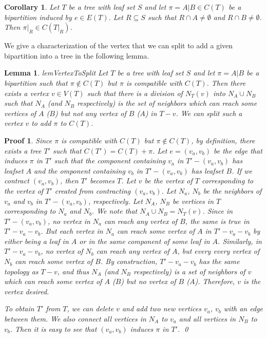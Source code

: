 \documentclass{bmcart}
\theoremstyle{mystyle}
\newtheorem{lemma}{Lemma}
\newtheorem{corollary}{Corollary}
\theoremstyle{proofstyle}
\newtheorem*{proof2}{Proof}
\newenvironment{proofnospace}{\begin{proof2}}{\qed \end{proof2}}
\begin{document}
\begin{corollary} \label{cor:bipar_restrict}
    Let $T$ be a tree with leaf set $S$ and let $\pi = A|B \in C(T)$ be a bipartition induced by $e \in E(T)$. Let $R \subseteq S$ such that $R \cap A \neq \emptyset$ and $R \cap B \neq \emptyset$. Then $\pi|_R \in C(T|_R)$. 
\end{corollary}

We give a characterization of the vertex that we can split to add a given bipartition into a tree in the following lemma.
\begin{lemma}{lemVertexToSplit} \label{lem:vertex_to_split}
    Let $T$ be a tree with leaf set $S$ and let $\pi = A|B$ be a bipartition such that $\pi \notin C(T)$ but $\pi$ is compatible with $C(T)$. Then there exists a vertex $v \in V(T)$ such that there is a division of $N_T(v)$ into $N_A \cup N_B$ such that $N_A$ (and $N_B$ respectively) is the set of neighbors which can reach some vertices of $A$ ($B$) but not any vertex of $B$ ($A$) in $T-v$. We can split such a vertex $v$ to add $\pi$ to $C(T)$.
\end{lemma}
\begin{proofnospace}
Since $\pi$ is compatible with $C(T)$ but $\pi \notin C(T)$, by definition, there exists a tree $T'$ such that $C(T') = C(T) + \pi$. Let $e = (v_a,v_b)$ be the edge that induces $\pi$ in $T'$ such that the component containing $v_a$ in $T'-(v_a,v_b)$ has leafset $A$ and the omponent containing $v_b$ in $T'-(v_a,v_b)$ has leafset $B$. If we contract $(v_a,v_b)$, then $T'$ becomes $T$. Let $v$ be the vertex of $T$ corresponding to the vertex of $T'$ created from contracting $(v_a,v_b)$. Let $N_a$, $N_b$ be the neighbors of $v_a$ and $v_b$ in $T'-(v_a,v_b)$, respectively. Let $N_A$, $N_B$ be vertices in $T$ corresponding to $N_a$ and $N_b$. We note that $N_A \cup N_B = N_T(v)$. Since in $T' -(v_a,v_b)$, no vertex in $N_a$ can reach any vertex of $B$, the same is true in $T' - v_a - v_b$. But each vertex in $N_a$ can reach some vertex of $A$ in $T' - v_a - v_b$ by either being a leaf in $A$ or in the same component of some leaf in $A$. Similarly, in $T' - v_a - v_b$, no vertex of $N_b$ can reach any vertex of $A$, but every every vertex of $N_b$ can reach some vertex of $B$. By construction, $T' - v_a - v_b$ has the same topology as $T - v$, and thus $N_A$ (and $N_B$ respectively) is a set of neighbors of $v$ which can reach some vertex of $A$ ($B$) but no vertex of $B$ ($A$). Therefore, $v$ is the vertex desired. \smallskip

To obtain $T'$ from $T$, we can delete $v$ and add two new vertices $v_a$, $v_b$ with an edge between them. We also connect all vertices in $N_A$ to $v_a$ and all vertices in $N_B$ to $v_b$. Then it is easy to see that $(v_a,v_b)$ induces $\pi$ in $T'$. 
\end{proofnospace}
\end{document}
